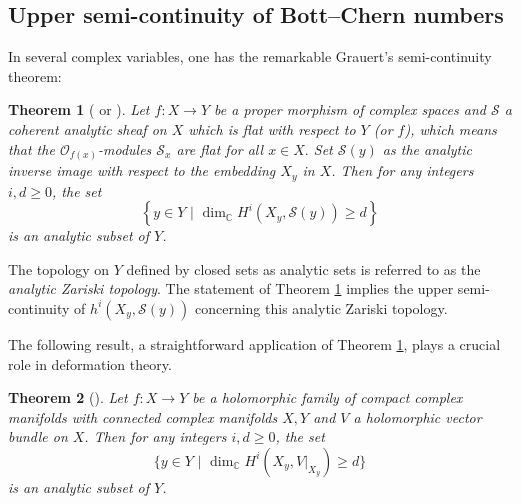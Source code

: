\documentclass[12pt]{amsart}
\numberwithin{equation}{section}
\newtheorem{theorem} {Theorem} [section]
\theoremstyle{definition}
\theoremstyle{definition}
\theoremstyle{definition}
\renewcommand{\1}{\mathsf{1}}
\renewcommand{\>}{\rightarrow}
\theoremstyle{plain} %
\theoremstyle{plain} %
\theoremstyle{plain} %
\begin{document}
	\subsection{Upper semi-continuity of Bott--Chern numbers}\label{further}
	In several complex variables, one has the remarkable Grauert's semi-continuity theorem:
	\begin{theorem}[{\cite[Theorem  4.12.() of Chapter \uppercase\expandafter{}]{BS76} or \cite{Gr60}}] \label{uppersemi}
		Let $f: X \rightarrow Y$ be a proper morphism of complex spaces and $\mathcal{S}$ a coherent analytic sheaf on $X$ which is flat with respect to $Y$ (or $f$), which means that the $\mathcal{O}_{f(x)}$-modules $\mathcal{S}_{x}$ are flat for all $x \in X .$ Set $\mathcal{S}(y)$ as the analytic inverse image with respect to the embedding $X_{y}$ in $X$. Then for any integers $i, d \geq 0$, the set
		$$
		\left\{y \in Y \,\, |\,\, \dim_{\mathbb{C}} H^{i}\left(X_{y}, \mathcal{S}(y)\right) \geq d\right\}
		$$
		is an analytic subset of $Y$.
	\end{theorem}
	The topology on $Y$ defined by closed sets as analytic sets is referred to as the \textit{analytic Zariski topology}. The statement of Theorem \ref{uppersemi} implies the upper semi-continuity of $h^{i}\left(X_{y}, \mathcal{S}(y)\right)$ concerning this analytic Zariski topology.
	
	The following result, a straightforward application of Theorem \ref{uppersemi}, plays a crucial role in deformation theory.
	
	\begin{theorem}[{\cite[$\S 10.5.4$]{GR84}}]\label{Upper semi-continuity}
		Let $f:X\rightarrow Y$ be a holomorphic family of compact complex manifolds with connected complex manifolds $X,Y$ and $V$ a holomorphic vector bundle on $X$. Then for any integers $i,d\geq 0$, the set $$\{y\in Y \,\, |\,\,   \dim_{\mathbb{C}} H^i(X_y,V|_{X_y})\geq d\}$$ is an analytic subset of $Y$.
	\end{theorem}
	
\end{document}
